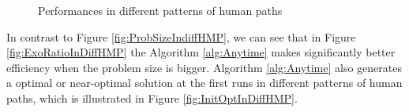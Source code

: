 \documentclass[12pt]{article}
\begin{document}
\begin{figure}[H] 
  \centering 
  \caption{Performances in different patterns of human paths} 
  \label{fig:PMdiffHP} %
\end{figure}

In contrast to Figure \ref{fig:ProbSizeIndiffHMP}, we can see that in Figure \ref{fig:ExoRatioInDiffHMP} the Algorithm \ref{alg:Anytime} makes significantly better efficiency when the problem size is bigger.
Algorithm \ref{alg:Anytime} also generates a optimal or near-optimal solution at the first runs in different patterns of human paths, which is illustrated in Figure \ref{fig:InitOptInDiffHMP}. 
\end{document}
